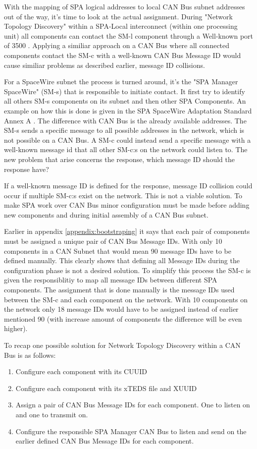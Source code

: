 With the mapping of SPA logical addresses to local CAN Bus subnet addresses out
of the way, it's time to look at the actual assignment. During "Network Topology
Discovery" within a SPA-Local interconnect (within one processing unit)
all components can contact the SM-l component through a Well-known port of
3500 \cite{standard:spa_local_adaptation}.
Applying a similiar approach on a CAN Bus where all connected components contact
the SM-c with a well-known CAN Bus Message ID would cause similiar problems as
described earlier, message ID collisions.

For a SpaceWire subnet the process is turned around, it's the "SPA Manager
SpaceWire" (SM-s) that is responsible to initiate contact. It first try to identify
all others SM-s components on its subnet and then other SPA Components. An example
on how this is done is given in the SPA SpaceWire Adaptation Standard Annex A
\cite{standard:spa_spacewire_adaptation}. The difference with CAN Bus is
the already available addresses. The SM-s sends a specific message to all
possible addresses in the network, which is not possible on a CAN Bus. A SM-c
could instead send a specific message with a well-known message id that all
other SM-c:s on the network could listen to. The new problem that arise concerns
the response, which message ID should the response have?

If a well-known message ID is defined for the response, message ID collision
could occur if multiple SM-c:s exist on the network. This is not a viable solution.
To make SPA work over CAN Bus minor configuration must be made before adding
new components and during initial assembly of a CAN Bus subnet.

Earlier in appendix \ref{appendix:bootstraping} it says that each pair of
components must be assigned a unique pair of CAN Bus Message IDs. With only
10 components in a CAN Subnet that would mean 90 message IDs have to be defined
manually. This clearly shows that defining all Message IDs during the configuration
phase is not a desired solution. To simplify this process the SM-c is given the
responsiblitiy to map all message IDs between different SPA components. The
assignment that is done manually is the message IDs used between the SM-c and
each component on the network. With 10 components on the network only 18 message
IDs would have to be assigned instead of earlier mentioned 90 (with increase
amount of components the difference will be even higher).

To recap one possible solution for Network Topology Discovery within a CAN Bus
is as follows:
\begin{enumerate}
    \item Configure each component with its CUUID
    \item Configure each component with its xTEDS file and XUUID
    \item Assign a pair of CAN Bus Message IDs for each component. One to listen
        on and one to transmit on.
    \item Configure the responsible SPA Manager CAN Bus to listen and send on the
        earlier defined CAN Bus Message IDs for each component.
\end{enumerate}

